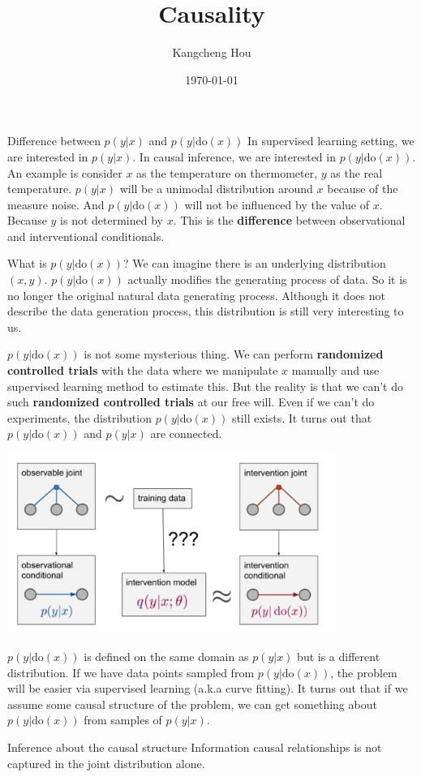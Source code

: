 \documentclass{beamer}
\title{Causality}
\author{Kangcheng Hou}
\institute{Zhejiang University}
\date{\today}
\begin{document}
    
\frame{\titlepage}
\begin{frame}{Difference between $p(y | x)$ and $p(y | \text{do}(x))$}
In supervised learning setting, we are interested in $p(y | x)$. In causal inference, we are interested in $p(y | \text{do}(x))$. An example is consider $x$ as the temperature on thermometer, $y$ as the real temperature. $p(y|x)$ will be a unimodal distribution around $x$ because of the measure noise. And $p(y | \text{do}(x))$ will not be influenced by the value of $x$. Because $y$ is not determined by $x$. This is the \textbf{difference} between observational and interventional conditionals. 


\end{frame}

\begin{frame}{What is $p(y | \text{do}(x))$?}
We can imagine there is an underlying distribution $(x,y)$. $p(y | \text{do}(x))$ actually modifies the generating process of data. So it is no longer the original natural data generating process. Although it does not describe the data generation process, this distribution is still very interesting to us.

$p(y | \text{do}(x))$ is not some mysterious thing. We can perform \textbf{randomized controlled trials} with the data where we manipulate $x$ manually and use supervised learning method to estimate this. But the reality is that we can't do such \textbf{randomized controlled trials} at our free will. Even if we can't do experiments, the distribution $p(y | \text{do}(x))$ still exists. It turns out that $p(y | \text{do}(x))$ and $p(y | x)$ are connected.

\end{frame}

\begin{frame}
\includegraphics[width=0.8\textwidth]{./img/link.jpg}

$p(y | \text{do}(x))$ is defined on the same domain as $p(y | x)$ but is a different distribution. If we have data points sampled from $p(y | \text{do}(x))$, the problem will be easier via supervised learning (a.k.a curve fitting). It turns out that if we assume some causal structure of the problem, we can get something about $p(y | \text{do}(x))$ from samples of $p(y | x)$.
\end{frame}

\begin{frame}{Inference about the causal structure}
Information causal relationships is not captured in the joint distribution alone. 

\end{frame}
\end{document}
